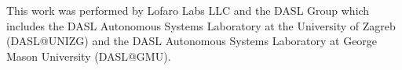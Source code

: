 This work was performed by Lofaro Labs LLC and the DASL Group which includes the DASL Autonomous Systems Laboratory at the University of Zagreb (DASL@UNIZG) and the DASL Autonomous Systems Laboratory at George Mason University (DASL@GMU).

